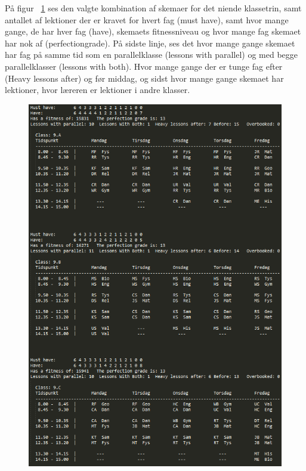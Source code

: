 På figur ~\ref{fig:test} ses den valgte kombination af skemaer for det niende klassetrin, samt antallet af lektioner der er kravet for hvert fag (must have), samt hvor mange gange, de har hver fag (have), skemaets fitnessniveau og hvor mange fag skemaet har nok af (perfectiongrade). På sidste linje, ses det hvor mange gange skemaet har fag på samme tid som en parallelklasse (lessons with parallel) og med begge parallelklasser (lessons with both). Hvor mange gange der er tunge fag efter (Heavy lessons after) og før middag, og sidst hvor mange gange skemaet har lektioner, hvor læreren er lektioner i andre klasser.

\begin{figure}[!h]
  \includegraphics[scale = 1]{partials/graphics/programtestres.png}
  \caption{}
  \label{fig:test}
\end{figure}